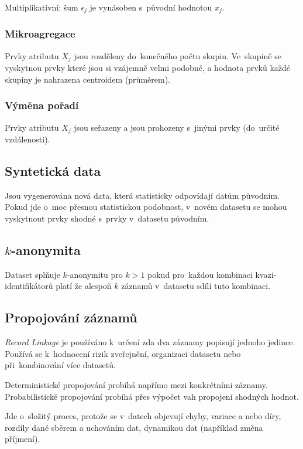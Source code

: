 Multiplikativní: šum $\epsilon_j$ je vynásoben s~původní hodnotou $x_j$.


\subsubsection*{Mikroagregace}

Prvky atributu $X_j$ jsou rozděleny do~konečného počtu skupin.
Ve~skupině se vyskytnou prvky které jsou si vzájemně velmi podobné, a hodnota prvků každé skupiny je nahrazena centroidem (průměrem).


\subsubsection*{Výměna pořadí}


Prvky atributu $X_j$ jsou seřazeny a jsou prohozeny s~jinými prvky (do~určité vzdálenosti).


\subsection{Syntetická data}

Jsou vygenerována nová data, která statisticky odpovídají datům původním.
Pokud jde o~moc přesnou statistickou podobnost, v~novém datasetu se mohou vyskytnout prvky shodné s~prvky v~datasetu původním.


\subsection{$k$-anonymita}

Dataset splňuje $k$-anonymitu pro $k > 1$ pokud pro~každou kombinaci kvazi-identifikátorů platí že alespoň $k$ záznamů v~datasetu sdílí tuto kombinaci.


\subsection{Propojování záznamů}

\emph{Record Linkage} je používáno k~určení zda dva záznamy popisují jednoho jedince.
Používá se k~hodnocení rizik zveřejnění, organizaci datasetu nebo při~kombinování více datasetů.

Deterministické propojování probíhá napřímo mezi konkrétními záznamy.
Probabilistické propojování probíhá přes výpočet vah propojení shodných hodnot.

Jde o~složitý proces, protože se v~datech objevují
chyby, variace a nebo díry,
rozdíly dané sběrem a uchováním dat,
dynamikou dat (například změna příjmení).
